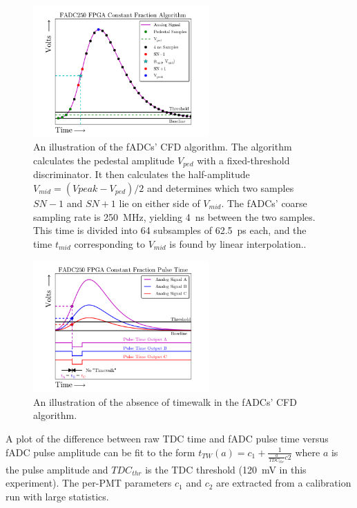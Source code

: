 \begin{itemize}
\begin{figure}[!h]
    \centering
    \includegraphics[width=0.6\textwidth]{chap4/pooser_cfd.png}
    \caption{
            An illustration of the fADCs' CFD algorithm.
            The algorithm calculates the pedestal amplitude $V_{ped}$ with a
            fixed-threshold discriminator.
            It then calculates the half-amplitude $V_{mid}=(V{peak}-V_{ped})/2$
            and determines which two samples $SN-1$ and $SN+1$ lie on either
            side of $V_{mid}$.
            The fADCs' coarse sampling rate is \SI{250}{\mega\hertz}, yielding
            \SI{4}{\nano\second} between the two samples.
            This time is divided into 64 subsamples of \SI{62.5}{\pico\second}
            each, and the time $t_{mid}$ corresponding to $V_{mid}$ is found by
            linear interpolation..
            }
    \label{fig:pooser_cfd}
\end{figure}

\begin{figure}[!h]
    \centering
    \includegraphics[width=0.6\textwidth]{chap4/pooser_notimewalk.png}
    \caption{
            An illustration of the absence of timewalk in the fADCs' CFD algorithm.
            }
    \label{fig:pooser_notimewalk}
\end{figure}

A plot of the difference between raw TDC time and fADC pulse time
versus fADC pulse amplitude can be fit to the form
$t_{TW}(a) = c_1 + \frac{1}{\frac{a}{TDC_{thr}}c2}$
where $a$ is the pulse amplitude and
$TDC_{thr}$ is the TDC threshold (\SI{120}{\milli\volt} in this experiment).
The per-PMT parameters $c_1$ and $c_2$ are extracted from a calibration run
with large statistics.


\end{itemize}
